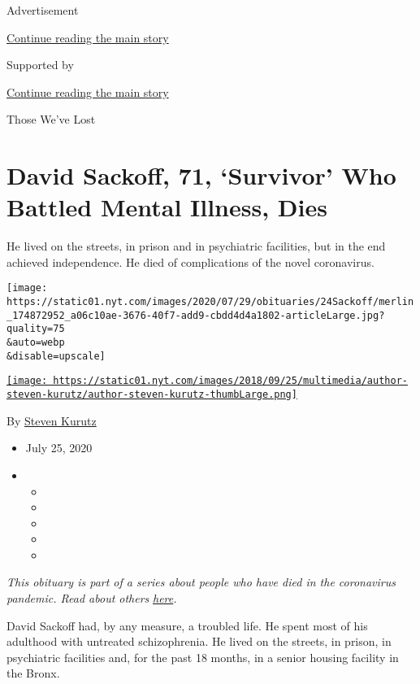 Advertisement

\protect\hyperlink{after-top}{Continue reading the main story}

Supported by

\protect\hyperlink{after-sponsor}{Continue reading the main story}

Those We've Lost

\hypertarget{david-sackoff-71-survivor-who-battled-mental-illness-dies}{%
\section{David Sackoff, 71, `Survivor' Who Battled Mental Illness,
Dies}\label{david-sackoff-71-survivor-who-battled-mental-illness-dies}}

He lived on the streets, in prison and in psychiatric facilities, but in
the end achieved independence. He died of complications of the novel
coronavirus.

\texttt{[image: https://static01.nyt.com/images/2020/07/29/obituaries/24Sackoff/merlin\_174872952\_a06c10ae-3676-40f7-add9-cbdd4d4a1802-articleLarge.jpg?quality=75\\\&auto=webp\\\&disable=upscale]}

\href{https://www.nytimes.com/by/steven-kurutz}{\texttt{[image: https://static01.nyt.com/images/2018/09/25/multimedia/author-steven-kurutz/author-steven-kurutz-thumbLarge.png]}}

By \href{https://www.nytimes.com/by/steven-kurutz}{Steven Kurutz}

\begin{itemize}
\item
  July 25, 2020
\item
  \begin{itemize}
  \item
  \item
  \item
  \item
  \item
  \end{itemize}
\end{itemize}

\emph{This obituary is part of a series about people who have died in
the coronavirus pandemic. Read about others}
\href{https://www.nytimes.com/interactive/2020/obituaries/people-died-coronavirus-obituaries.html}{\emph{here}}\emph{.}

David Sackoff had, by any measure, a troubled life. He spent most of his
adulthood with untreated schizophrenia. He lived on the streets, in
prison, in psychiatric facilities and, for the past 18 months, in a
senior housing facility in the Bronx.

